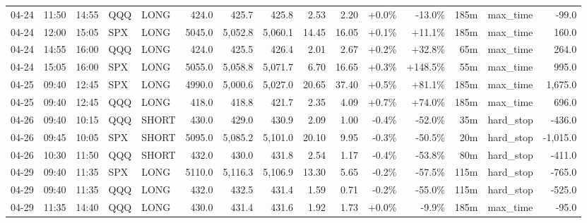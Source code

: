 \documentclass[11pt,a4paper,twoside]{article}
\begin{document}
\begin{landscape}
\begin{center}
\begin{longtable}{>{\color{txtmain}}l l l l l r r r r r r r r >{\color{txtmain}}l r}
04-24 & 11:50 & 14:55 & QQQ & LONG & 424.0 & 425.7 & 425.8 & 2.53 & 2.20 & \textcolor{wingreen}{+0.0\%} & \textcolor{lossred}{-13.0\%} & 185m & max\_time & \textcolor{lossred}{-99.0} \\
04-24 & 12:00 & 15:05 & SPX & LONG & 5045.0 & 5,052.8 & 5,060.1 & 14.45 & 16.05 & \textcolor{wingreen}{+0.1\%} & \textcolor{wingreen}{+11.1\%} & 185m & max\_time & \textcolor{wingreen}{160.0} \\
04-24 & 14:55 & 16:00 & QQQ & LONG & 424.0 & 425.5 & 426.4 & 2.01 & 2.67 & \textcolor{wingreen}{+0.2\%} & \textcolor{wingreen}{+32.8\%} & 65m & max\_time & \textcolor{wingreen}{264.0} \\
04-24 & 15:05 & 16:00 & SPX & LONG & 5055.0 & 5,058.8 & 5,071.7 & 6.70 & 16.65 & \textcolor{wingreen}{+0.3\%} & \textcolor{wingreen}{+148.5\%} & 55m & max\_time & \textcolor{wingreen}{995.0} \\
04-25 & 09:40 & 12:45 & SPX & LONG & 4990.0 & 5,000.6 & 5,027.0 & 20.65 & 37.40 & \textcolor{wingreen}{+0.5\%} & \textcolor{wingreen}{+81.1\%} & 185m & max\_time & \textcolor{wingreen}{1,675.0} \\
04-25 & 09:40 & 12:45 & QQQ & LONG & 418.0 & 418.8 & 421.7 & 2.35 & 4.09 & \textcolor{wingreen}{+0.7\%} & \textcolor{wingreen}{+74.0\%} & 185m & max\_time & \textcolor{wingreen}{696.0} \\
04-26 & 09:40 & 10:15 & QQQ & SHORT & 430.0 & 429.0 & 430.9 & 2.09 & 1.00 & \textcolor{lossred}{-0.4\%} & \textcolor{lossred}{-52.0\%} & 35m & hard\_stop & \textcolor{lossred}{-436.0} \\
04-26 & 09:45 & 10:05 & SPX & SHORT & 5095.0 & 5,085.2 & 5,101.0 & 20.10 & 9.95 & \textcolor{lossred}{-0.3\%} & \textcolor{lossred}{-50.5\%} & 20m & hard\_stop & \textcolor{lossred}{-1,015.0} \\
04-26 & 10:30 & 11:50 & QQQ & SHORT & 432.0 & 430.0 & 431.8 & 2.54 & 1.17 & \textcolor{lossred}{-0.4\%} & \textcolor{lossred}{-53.8\%} & 80m & hard\_stop & \textcolor{lossred}{-411.0} \\
04-29 & 09:40 & 11:35 & SPX & LONG & 5110.0 & 5,116.3 & 5,106.9 & 13.30 & 5.65 & \textcolor{lossred}{-0.2\%} & \textcolor{lossred}{-57.5\%} & 115m & hard\_stop & \textcolor{lossred}{-765.0} \\
04-29 & 09:40 & 11:35 & QQQ & LONG & 432.0 & 432.5 & 431.4 & 1.59 & 0.71 & \textcolor{lossred}{-0.2\%} & \textcolor{lossred}{-55.0\%} & 115m & hard\_stop & \textcolor{lossred}{-525.0} \\
04-29 & 11:35 & 14:40 & QQQ & LONG & 430.0 & 431.4 & 431.6 & 1.92 & 1.73 & \textcolor{wingreen}{+0.0\%} & \textcolor{lossred}{-9.9\%} & 185m & max\_time & \textcolor{lossred}{-95.0} \\

\end{longtable}
\end{center}
\end{landscape}
\end{document}
